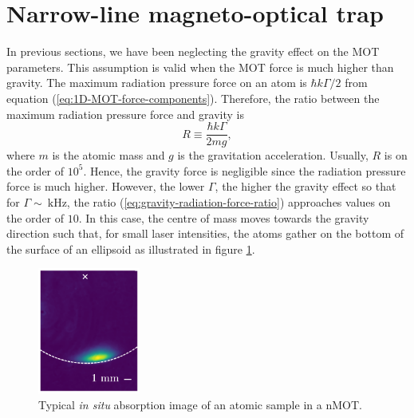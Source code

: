 %
\newpage
\section{Narrow-line magneto-optical trap}
\label{sec:narrow-line-MOT}
%

In previous sections, we have been neglecting the gravity effect on the MOT parameters. This assumption is valid when the MOT force is much higher than gravity. The maximum radiation pressure force on an atom is $ \hbar k \Gamma / 2 $ from equation (\ref{eq:1D-MOT-force-components}). Therefore, the ratio between the maximum radiation pressure force and gravity is
\begin{equation}
    R \equiv \frac{\hbar k \Gamma}{2 m g},
    \label{eq:gravity-radiation-force-ratio}
\end{equation}
where $ m $ is the atomic mass and $ g $ is the gravitation acceleration. Usually, $ R $ is on the order of $ 10^5 $. Hence, the gravity force is negligible since the radiation pressure force is much higher. However, the lower $ \Gamma $, the higher the gravity effect so that for $ \Gamma \sim\ \textrm{kHz} $, the ratio (\ref{eq:gravity-radiation-force-ratio}) approaches values on the order of $ 10 $. In this case, the centre of mass moves towards the gravity direction such that, for small laser intensities, the atoms gather on the bottom of the surface of an ellipsoid as illustrated in figure \ref{fig:atomic-cloud-shape-nMOTs}.

\begin{figure}[!ht]
    \centering
    \includegraphics[width=0.3\textwidth]{USPSC-img/atomic_cloud_shape_in_nMOTs.png}
    \caption{Typical \textit{in situ} absorption image of an atomic sample in a nMOT.}
    \label{fig:atomic-cloud-shape-nMOTs}
\end{figure}

